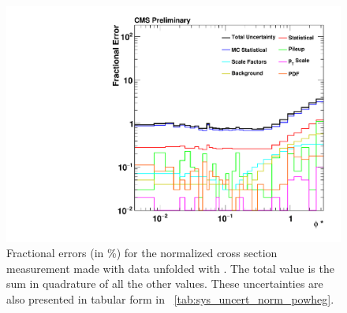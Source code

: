 \begin{figure}[!p]
    \centering
    \includegraphics[width=\textwidth]{figures/data_uncertainty_normalized_powheg_unfolded.pdf}
    \caption[
        Fractional errors (in \%) for the normalized cross section measurement
        made with data unfolded with \POWHEG.
    ]{
        Fractional errors (in \%) for the normalized cross section measurement
        made with data unfolded with \POWHEG. The total value is the sum in
        quadrature of all the other values. These uncertainties are also
        presented in tabular form in \TAB~\ref{tab:sys_uncert_norm_powheg}.
    }
    \label{fig:sys_uncert_norm_powheg}
\end{figure}
